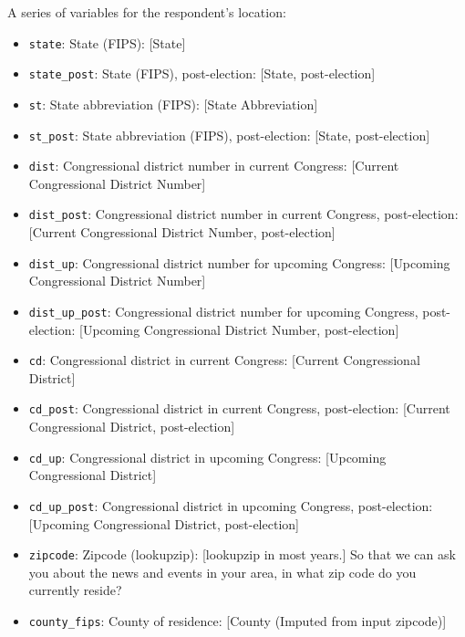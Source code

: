 \documentclass[10pt,article,oneside]{memoir}
\theoremstyle{definition}
\begin{document}
A series of variables for the respondent's location:

\begin{itemize}
\tightlist
\item
  \texttt{state}: State (FIPS): {[}State{]}
\item
  \texttt{state\_post}: State (FIPS), post-election: {[}State,
  post-election{]}
\item
  \texttt{st}: State abbreviation (FIPS): {[}State Abbreviation{]}
\item
  \texttt{st\_post}: State abbreviation (FIPS), post-election: {[}State,
  post-election{]}
\item
  \texttt{dist}: Congressional district number in current Congress:
  {[}Current Congressional District Number{]}
\item
  \texttt{dist\_post}: Congressional district number in current
  Congress, post-election: {[}Current Congressional District Number,
  post-election{]}
\item
  \texttt{dist\_up}: Congressional district number for upcoming
  Congress: {[}Upcoming Congressional District Number{]}
\item
  \texttt{dist\_up\_post}: Congressional district number for upcoming
  Congress, post-election: {[}Upcoming Congressional District Number,
  post-election{]}
\item
  \texttt{cd}: Congressional district in current Congress: {[}Current
  Congressional District{]}
\item
  \texttt{cd\_post}: Congressional district in current Congress,
  post-election: {[}Current Congressional District, post-election{]}
\item
  \texttt{cd\_up}: Congressional district in upcoming Congress:
  {[}Upcoming Congressional District{]}
\item
  \texttt{cd\_up\_post}: Congressional district in upcoming Congress,
  post-election: {[}Upcoming Congressional District, post-election{]}
\item
  \texttt{zipcode}: Zipcode (lookupzip): {[}lookupzip in most years.{]}
  So that we can ask you about the news and events in your area, in what
  zip code do you currently reside?
\item
  \texttt{county\_fips}: County of residence: {[}County (Imputed from
  input zipcode){]}
\end{itemize}
\end{document}
